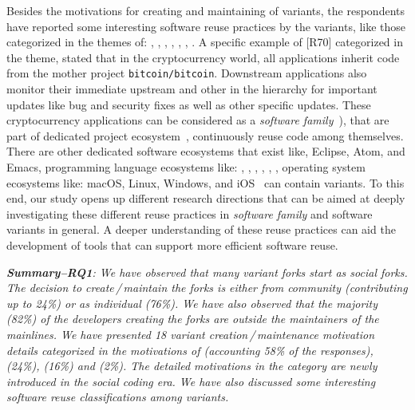 Besides the motivations for creating and maintaining of variants, the respondents have reported some interesting software reuse practices by the variants, like those categorized in the themes of: , , , , , , . A specific example of [R70] categorized in the  theme, stated that in the cryptocurrency world, all applications inherit code from the mother project \texttt{bitcoin/bitcoin}. Downstream applications also monitor their immediate upstream and other in the hierarchy for important updates like bug and security fixes as well as other specific updates. These cryptocurrency applications can be considered as a \textit{software family}~\cite{businge:2018icsme,businge:emse:2021}), that are part of dedicated project ecosystem~\cite{tommens:2020}, continuously reuse code among themselves.
There are other dedicated software ecosystems that exist like, \textsf{Eclipse}, \textsf{Atom}, and \textsf{Emacs}, programming language ecosystems like:  \java, \cp, \cpp, \py, \go, \rb, operating system ecosystems like: \textsf{macOS}, \textsf{Linux}, \textsf{Windows}, and \textsf{iOS}~\cite{tommens:2020} can contain variants.
To this end, our study opens up different research directions that can be aimed at deeply investigating these different reuse practices in \textit{software family} and software variants in general. A deeper understanding of these reuse practices can aid the development of tools that can support more efficient software reuse.

\begin{framed}
\noindent
\emph{\textbf{Summary--RQ1}:
We have observed that many variant forks start as social forks. The decision to create\,/\,maintain the forks is either from community (contributing up to 24\%) or as individual (76\%). We have also observed that the majority (82\%) of the developers creating the forks are outside the maintainers of the mainlines. We have presented 18 variant creation\,/\,maintenance motivation details categorized in the motivations of  (accounting 58\% of the responses),  (24\%),  (16\%) and  (2\%). The detailed motivations in the  category are newly introduced in the social coding era. We have also discussed some interesting software reuse classifications among variants.
}
\end{framed}


